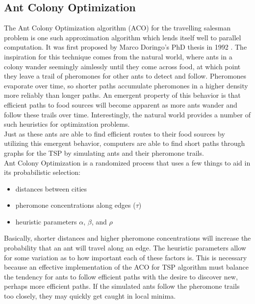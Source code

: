 \documentclass[twocolumn]{article}
\begin{document}
\subsection{Ant Colony Optimization} \label{sub:aco}

The Ant Colony Optimization algorithm (ACO) for the travelling salesman problem 
is one such approximation algorithm which lends itself well to parallel 
computation. It was first proposed by Marco Doringo's PhD thesis in 1992 %
. The 
inspiration for this technique comes from the natural world, where ants in a
colony wander seemingly aimlessly until they come across food, at which point
they leave a trail of pheromones for other ants to detect and follow. Pheromones
evaporate over time, so shorter paths accumulate pheromones in a higher density 
more reliably than longer paths. An emergent property of this behavior is that 
efficient paths to food sources will become apparent as more ants wander and 
follow these trails over time. Interestingly, the natural world provides a number
of such heuristics for optimization problems.\\

Just as these ants are able to find efficient routes to their food sources by
utilizing this emergent behavior, computers are able to find short paths through
graphs for the TSP by simulating ants and their pheromone trails. \\

Ant Colony Optimization is a randomized process that uses a few things to aid
in its probabilistic selection:
\begin{itemize}
\item distances between cities
\item pheromone concentrations along edges ($\tau$)
\item heuristic parameters $\alpha$, $\beta$, and $\rho$
\end{itemize}
Basically, shorter distances and higher pheromone concentrations will
increase the probability that an ant will travel along an edge. The 
heuristic parameters allow for some variation as to how important 
each of these factors is. This is necessary because an effective 
implementation of the ACO for TSP algorithm must balance the tendency
for ants to follow efficient paths with the desire to discover new, 
perhaps more efficient paths. If the simulated ants follow the 
pheromone trails too closely, they may quickly get caught in local
minima. \\
\end{document}
